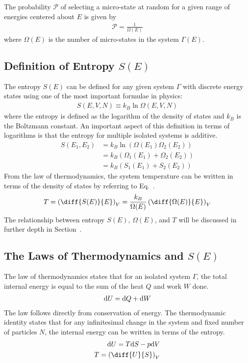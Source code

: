The probability $\mathcal{P}$ of selecting a micro-state at random for a given range of energies centered about $E$ is given by
\begin{align}
    \mathcal{P} = \frac{1}{\Omega(E)}
\end{align}
where $\Omega(E)$ is the number of micro-states in the system $\Gamma(E)$.

\subsection{Definition of Entropy $S(E)$}\label{entropy}
The entropy $S(E)$ can be defined for any given system $\Gamma$ with discrete energy states using one of the most important formulae in physics:
\begin{align}\label{sdos}
    S(E,V,N) \equiv k_B \ln\Omega(E,V,N)
\end{align}
where the entropy is defined as the logarithm of the density of states and $k_B$ is the Boltzmann constant. An important aspect of this definition in terms of logarithms is that the entropy for multiple isolated systems is additive.
\begin{align}
    S(E_1,E_2) &= k_B \ln(\Omega(E_1)\Omega_2(E_2)) \\
    &= k_B \left( \Omega_1(E_1) + \Omega_2(E_2)\right) \\
    &= k_B \left( S_1(E_1) + S_2(E_2)\right)
\end{align}
From the  law of thermodynamics, the system temperature can be written in terms of the density of states by referring to Eq.~.
\begin{align}
    T = \left(\diff{S(E)}{E}\right)_V = \frac{k_B}{\Omega(E)}\left(\diff{\Omega(E)}{E}\right)_V
\end{align}
The relationship between entropy $S(E)$, $\Omega(E)$, and $T$ will be discussed in further depth in Section~.

\subsection{The Laws of Thermodynamics and $S(E)$}\label{laws}
The  law of thermodynamics states that for an isolated system $\Gamma$, the total internal energy is equal to the sum of the heat $Q$ and work $W$ done.
\begin{align}
    \text{d}U = \text{d}Q + \text{d}W
\end{align}
The  law follows directly from conservation of energy. The thermodynamic identity states that for any infinitesimal change in the system and fixed number of particles $N$, the internal energy can be written in terms of the entropy.
\begin{align}
    \D{U} =  T\D{S} - p\D{V} \\
    T = \left(\diff{U}{S}\right)_V
\end{align}

